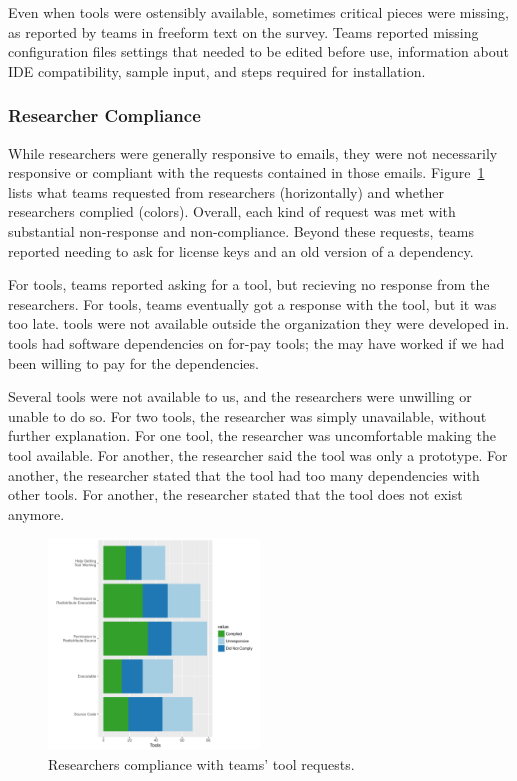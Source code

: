 \documentclass[10pt,conference]{IEEEtran}
\begin{document}
Even when tools were ostensibly available,
sometimes critical pieces were missing,
as reported by teams in freeform text on the survey.
Teams reported missing configuration files
settings that needed to be edited before use, 
information about IDE compatibility,
sample input,
and steps required for installation. 

\subsubsection{Researcher Compliance}

While researchers were generally responsive to emails,
they were not necessarily responsive or compliant 
with the requests contained in those emails.
Figure~\ref{fig:requests} lists what teams requested from researchers
(horizontally) and whether researchers complied (colors).
Overall, each kind of request was met with substantial non-response and
non-compliance.
Beyond these requests, teams reported needing to ask for 
license keys and
an old version of a dependency.

For \unworkNoResponseToAsk tools, teams reported asking for a tool,
but recieving no response from the researchers.
For \unworkTooLate tools, teams eventually got a response with the tool, 
but it was  too late.
\unworkInternal tools were not available outside the organization
they were developed in.
\unworkPay tools had software dependencies on for-pay tools; 
the may have worked if we had been willing to pay 
for the dependencies.

Several tools were not available to us, 
and the researchers were unwilling or unable to do so.
For two tools, the researcher was simply unavailable,
without further explanation.
For one tool, the researcher was uncomfortable making 
the tool available.
For another, the researcher said the tool was only a prototype.
For another, the researcher stated that the tool had too
many dependencies with other tools.
For another, the researcher stated that the tool does not
exist anymore.

\begin{figure}[!t]
  \centering
    \includegraphics[width=0.5\textwidth]{requestPlot.pdf}
  \caption{Researchers compliance with teams' tool requests.}\label{fig:requests}
\end{figure}
\end{document}
